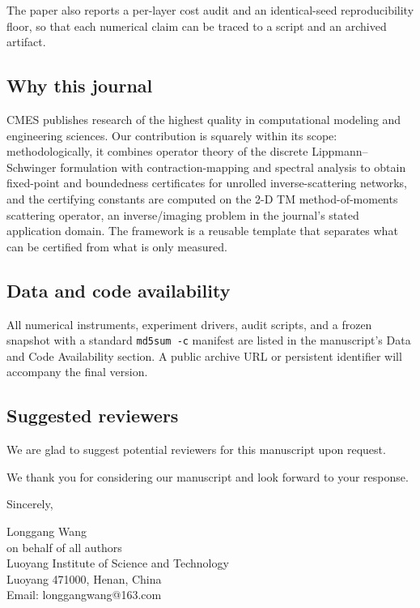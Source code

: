 \documentclass[11pt]{article}
\begin{document}
The paper also reports a per-layer cost audit and an identical-seed reproducibility
floor, so that each numerical claim can be traced to a script and an archived artifact.

\subsection*{Why this journal}

CMES publishes research of the highest quality in computational modeling and engineering
sciences. Our contribution is squarely within its scope: methodologically, it combines
operator theory of the discrete Lippmann--Schwinger formulation with contraction-mapping
and spectral analysis to obtain fixed-point and boundedness certificates for unrolled
inverse-scattering networks, and the certifying constants are computed on the 2-D TM
method-of-moments scattering operator, an inverse/imaging problem in the journal's stated
application domain. The framework is a reusable template that separates what can be
certified from what is only measured.

\subsection*{Data and code availability}

All numerical instruments, experiment drivers, audit scripts, and a frozen snapshot with
a standard \texttt{md5sum -c} manifest are listed in the manuscript's Data and Code
Availability section. A public archive URL or persistent identifier will accompany the
final version.

\subsection*{Suggested reviewers}

We are glad to suggest potential reviewers for this manuscript upon request.

We thank you for considering our manuscript and look forward to your response.

\vspace{1.5em}

Sincerely,

\vspace{1.5em}

Longgang Wang \\
on behalf of all authors \\
Luoyang Institute of Science and Technology \\
Luoyang 471000, Henan, China \\
Email: longgangwang@163.com
\end{document}
